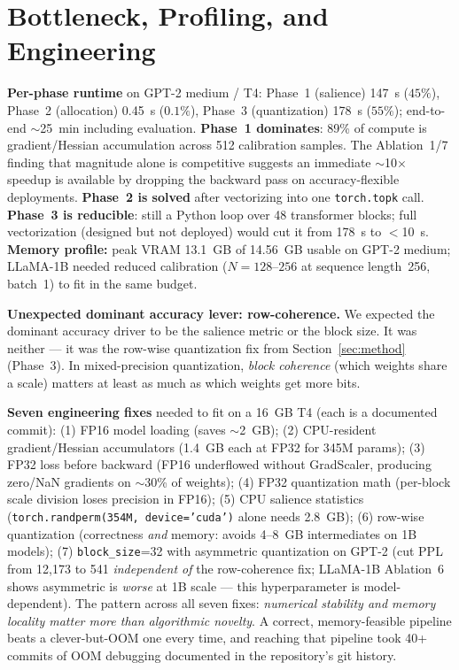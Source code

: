 \documentclass[11pt]{article}
\begin{document}
\section{Bottleneck, Profiling, and Engineering}
\label{sec:bottleneck}

\textbf{Per-phase runtime} on GPT-2 medium / T4: Phase~1 (salience) 147~s ($45\%$),
Phase~2 (allocation) 0.45~s ($0.1\%$), Phase~3 (quantization) 178~s ($55\%$); end-to-end
$\sim$25~min including evaluation.
\textbf{Phase~1 dominates}: 89\% of compute is gradient/Hessian accumulation across 512
calibration samples.
The Ablation~1/7 finding that magnitude alone is competitive suggests an immediate
$\sim$10$\times$ speedup is available by dropping the backward pass on
accuracy-flexible deployments.
\textbf{Phase~2 is solved} after vectorizing into one \texttt{torch.topk} call.
\textbf{Phase~3 is reducible}: still a Python loop over 48 transformer blocks; full
vectorization (designed but not deployed) would cut it from 178~s to $<$10~s.
\textbf{Memory profile:} peak VRAM 13.1~GB of 14.56~GB usable on GPT-2 medium;
LLaMA-1B needed reduced calibration ($N{=}128$--$256$ at sequence length~256, batch~1) to
fit in the same budget.

\textbf{Unexpected dominant accuracy lever: row-coherence.}
We expected the dominant accuracy driver to be the salience metric or the block size.
It was neither --- it was the row-wise quantization fix from Section~\ref{sec:method}
(Phase~3).
In mixed-precision quantization, \emph{block coherence} (which weights share a scale)
matters at least as much as which weights get more bits.

\textbf{Seven engineering fixes} needed to fit on a 16~GB T4 (each is a documented commit):
(1) FP16 model loading (saves $\sim$2~GB);
(2) CPU-resident gradient/Hessian accumulators (1.4~GB each at FP32 for 345M params);
(3) FP32 loss before backward (FP16 underflowed without GradScaler, producing zero/NaN
gradients on $\sim$30\% of weights);
(4) FP32 quantization math (per-block scale division loses precision in FP16);
(5) CPU salience statistics (\texttt{torch.randperm(354M, device='cuda')} alone needs
2.8~GB);
(6) row-wise quantization (correctness \emph{and} memory: avoids 4--8~GB intermediates on
1B models);
(7) \texttt{block\_size}=32 with asymmetric quantization on GPT-2 (cut PPL from 12{,}173
to 541 \emph{independent of} the row-coherence fix; LLaMA-1B Ablation~6 shows asymmetric
is \emph{worse} at 1B scale --- this hyperparameter is model-dependent).
The pattern across all seven fixes: \emph{numerical stability and memory locality matter
more than algorithmic novelty}.
A correct, memory-feasible pipeline beats a clever-but-OOM one every time, and reaching
that pipeline took 40+ commits of OOM debugging documented in the repository's git history.
\end{document}
